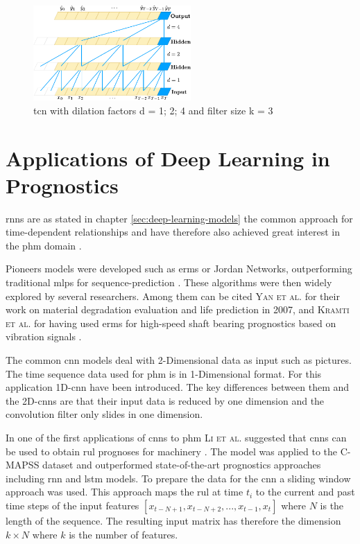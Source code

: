 \documentclass[conference]{IEEEtran}
\begin{document}
\begin{figure}[htp]
	\centering
	\includegraphics[width=6cm]{tcn_architecture.pdf}
	\caption{\gls{tcn} with dilation factors d = 1; 2; 4 and filter size k = 3 \cite{Bai2018}}
	\label{fig:tcn-architecture}
\end{figure}

\section{Applications of Deep Learning in Prognostics}
\label{sec:applications-of-deep-learning-in-prognostics}

\glspl{rnn} are as stated in chapter \ref{sec:deep-learning-models} the common approach for time-dependent relationships and have therefore also achieved great interest in the \gls{phm} domain \cite{Akrim2021}.


Pioneers models were developed such as \glspl{erm} or Jordan Networks, outperforming traditional \glspl{mlp} for sequence-prediction \cite{Akrim2021}. These algorithms were then widely explored by several researchers. Among them can be cited \textsc{Yan et al.} for their work on material degradation evaluation and life prediction in 2007, and \textsc{Kramti et al.} for having used \glspl{erm} for high-speed shaft bearing prognostics based on vibration signals \cite{Akrim2021}.

The common \gls{cnn} models deal with 2-Dimensional data as input such as pictures. The time sequence data used for \gls{phm} is in 1-Dimensional format. For this application 1D-\gls{cnn} have been introduced. The key differences between them and the 2D-\glspl{cnn} are that their input data is reduced by one dimension and the convolution filter only slides in one dimension. \cite{Akrim2021}

In one of the first applications of \glspl{cnn} to \gls{phm} \textsc{Li et al.} suggested that \glspl{cnn} can be used to obtain \gls{rul} prognoses for machinery \cite{LI20181}. The model was applied to the C-MAPSS dataset \cite{Saxena2008} and outperformed state-of-the-art prognostics approaches including \gls{rnn} and \gls{lstm} models. To prepare the data for the \gls{cnn} a sliding window approach was used. This approach maps the \gls{rul} at time $ t_i $ to the current and past time steps of the input features $ [x_{t-N+1}, x_{t-N+2},..., x_{t-1}, x_t] $ where $ N $ is the length of the sequence. The resulting input matrix has therefore the dimension $ k \times N $ where $ k $ is the number of features.
\end{document}
